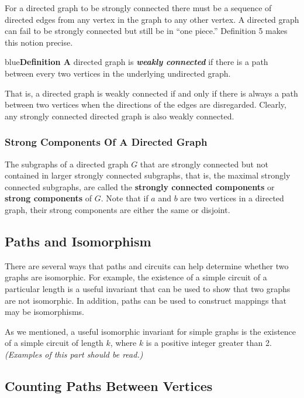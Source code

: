 \documentclass[11pt]{article}
\newenvironment{definition}[1]{\begin{mybox}{blue}{\textbf{Definition #1}}}{\end{mybox}}
\begin{document}
For a directed graph to be strongly connected there must be a sequence of directed edges from any vertex in the graph to any other vertex. A directed graph can fail to be strongly connected but still be in “one piece.” Definition 5 makes this notion precise.

\begin{definition}{5}
A directed graph is \textit{\textbf{weakly connected}} if there is a path between every two vertices in the underlying undirected graph.
\end{definition}

That is, a directed graph is weakly connected if and only if there is always a path between two vertices when the directions of the edges are disregarded. Clearly, any strongly connected directed graph is also weakly connected.

\subsubsection{Strong Components Of A Directed Graph}

The subgraphs of a directed graph $G$ that are strongly connected but not contained in larger strongly connected subgraphs, that is, the maximal strongly connected subgraphs, are called the \textbf{strongly connected components} or \textbf{strong components} of $G$. Note that if $a$ and $b$ are two vertices in a directed graph, their strong components are either the same or disjoint.

\subsection{Paths and Isomorphism}

There are several ways that paths and circuits can help determine whether two graphs are isomorphic. For example, the existence of a simple circuit of a particular length is a useful invariant that can be used to show that two graphs are not isomorphic. In addition, paths can be used to construct mappings that may be isomorphisms.

As we mentioned, a useful isomorphic invariant for simple graphs is the existence of a simple circuit of length $k$, where $k$ is a positive integer greater than 2. \textit{(Examples of this part should be read.)}

\subsection{Counting Paths Between Vertices}
\end{document}
